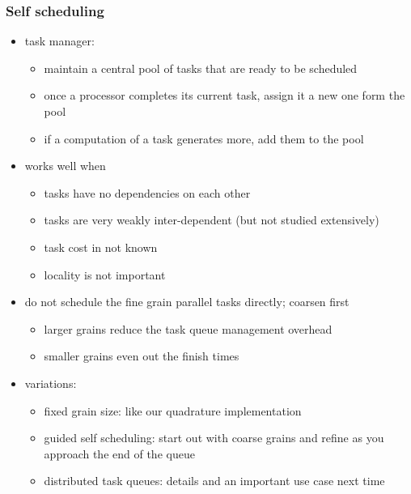 \begin{frame}[fragile]
%
  \frametitle{Self scheduling}
%
  \begin{itemize}
%
  \item task manager:
    \begin{itemize}
    \item maintain a central pool of tasks that are ready to be scheduled
    \item once a processor completes its current task, assign it a new one form the pool
    \item if a computation of a task generates more, add them to the pool
    \end{itemize}
%
  \item works well when
    \begin{itemize}
    \item tasks have no dependencies on each other
    \item tasks are very weakly inter-dependent (but not studied extensively)
    \item task cost in not known
    \item locality is not important
    \end{itemize}
%
  \item do not schedule the fine grain parallel tasks directly; coarsen first
    \begin{itemize}
    \item larger grains reduce the task queue management overhead
    \item smaller grains even out the finish times
    \end{itemize}
%
  \item variations:
    \begin{itemize}
    \item fixed grain size: like our quadrature implementation
    \item guided self scheduling: start out with coarse grains and refine as you approach the
      end of the queue
    \item distributed task queues: details and an important use case next time 
    \end{itemize}
%
  \end{itemize}
%
\end{frame}

